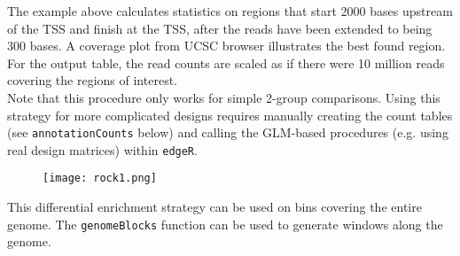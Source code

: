 \noindent The example above calculates statistics on regions that start 2000 bases upstream of the TSS and finish at the TSS, after the reads have been extended to being 300 bases. A coverage plot from UCSC browser illustrates the best found region.  For the output table, the read counts are scaled as if there were 10 million reads covering the regions of interest. \\

\noindent Note that this procedure only works for simple 2-group comparisons.  Using this strategy for more complicated designs requires manually creating the count tables (see \texttt{annotationCounts} below) and calling the GLM-based procedures (e.g. using real design matrices) within \texttt{edgeR}. \\


\begin{figure}[!h]
    \begin{center}
        \texttt{[image: rock1.png]}
    \end{center}
\end{figure}

This differential enrichment strategy can be used on bins covering the entire genome.  The \texttt{genomeBlocks} function can be used to generate windows along the genome.
